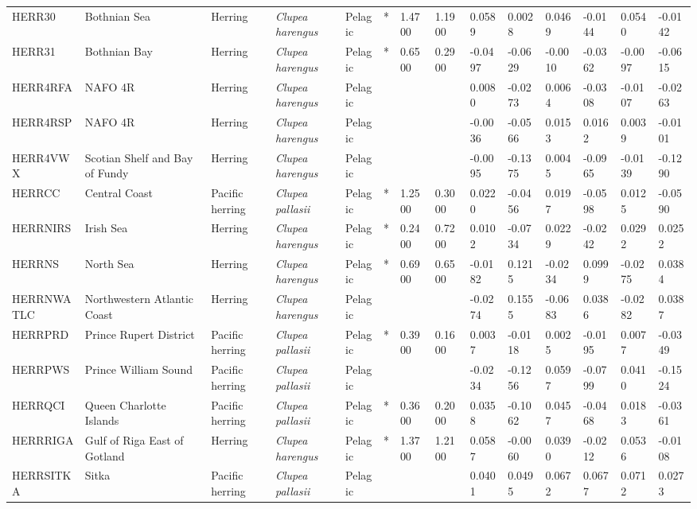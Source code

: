 \begin{longtable}{p{2.8cm}p{2cm}p{1.7cm}p{1.7cm}p{1cm}p{0.3cm}p{1cm}p{1cm}p{1cm}p{1cm}p{1cm}p{1cm}p{1cm}p{1cm}}
  HERR30 & Bothnian Sea & Herring & \textit{Clupea harengus} & Pelagic & * & 1.4700 & 1.1900 & 0.0589 & 0.0028 & 0.0469 & -0.0144 & 0.0540 & -0.0142 \\ 
  HERR31 & Bothnian Bay & Herring & \textit{Clupea harengus} & Pelagic & * & 0.6500 & 0.2900 & -0.0497 & -0.0629 & -0.0010 & -0.0362 & -0.0097 & -0.0615 \\ 
  HERR4RFA & NAFO 4R & Herring & \textit{Clupea harengus} & Pelagic &  &  &  & 0.0080 & -0.0273 & 0.0064 & -0.0308 & -0.0107 & -0.0263 \\ 
  HERR4RSP & NAFO 4R & Herring & \textit{Clupea harengus} & Pelagic &  &  &  & -0.0036 & -0.0566 & 0.0153 & 0.0162 & 0.0039 & -0.0101 \\ 
  HERR4VWX & Scotian Shelf and Bay of Fundy & Herring & \textit{Clupea harengus} & Pelagic &  &  &  & -0.0095 & -0.1375 & 0.0045 & -0.0965 & -0.0139 & -0.1290 \\ 
  HERRCC & Central Coast & Pacific herring & \textit{Clupea pallasii} & Pelagic & * & 1.2500 & 0.3000 & 0.0220 & -0.0456 & 0.0197 & -0.0598 & 0.0125 & -0.0590 \\ 
  HERRNIRS & Irish Sea & Herring & \textit{Clupea harengus} & Pelagic & * & 0.2400 & 0.7200 & 0.0102 & -0.0734 & 0.0229 & -0.0242 & 0.0292 & 0.0252 \\ 
  HERRNS & North Sea & Herring & \textit{Clupea harengus} & Pelagic & * & 0.6900 & 0.6500 & -0.0182 & 0.1215 & -0.0234 & 0.0999 & -0.0275 & 0.0384 \\ 
  HERRNWATLC & Northwestern Atlantic Coast & Herring & \textit{Clupea harengus} & Pelagic &  &  &  & -0.0274 & 0.1555 & -0.0683 & 0.0386 & -0.0282 & 0.0387 \\ 
  HERRPRD & Prince Rupert District & Pacific herring & \textit{Clupea pallasii} & Pelagic & * & 0.3900 & 0.1600 & 0.0037 & -0.0118 & 0.0025 & -0.0195 & 0.0077 & -0.0349 \\ 
  HERRPWS & Prince William Sound & Pacific herring & \textit{Clupea pallasii} & Pelagic &  &  &  & -0.0234 & -0.1256 & 0.0597 & -0.0799 & 0.0410 & -0.1524 \\ 
  HERRQCI & Queen Charlotte Islands & Pacific herring & \textit{Clupea pallasii} & Pelagic & * & 0.3600 & 0.2000 & 0.0358 & -0.1062 & 0.0457 & -0.0468 & 0.0183 & -0.0361 \\ 
  HERRRIGA & Gulf of Riga East of Gotland & Herring & \textit{Clupea harengus} & Pelagic & * & 1.3700 & 1.2100 & 0.0587 & -0.0060 & 0.0390 & -0.0212 & 0.0536 & -0.0108 \\ 
  HERRSITKA & Sitka & Pacific herring & \textit{Clupea pallasii} & Pelagic &  &  &  & 0.0401 & 0.0495 & 0.0672 & 0.0677 & 0.0712 & 0.0273 \\ 

\end{longtable}
